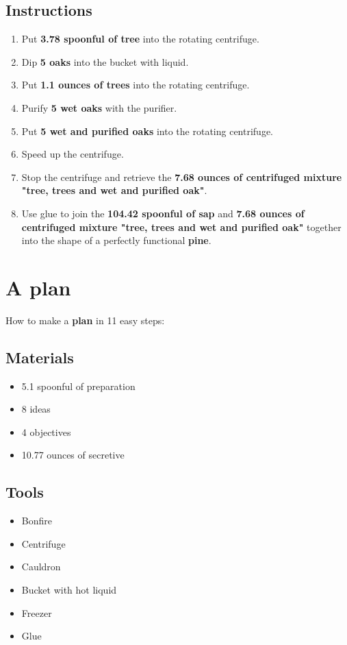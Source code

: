 \documentclass{article}
\begin{document}
\subsection{Instructions}\begin{enumerate}
\item 
Put \textbf{3.78 spoonful of tree} into the rotating centrifuge.
\item 
Dip \textbf{5 oaks} into the bucket with liquid.
\item 
Put \textbf{1.1 ounces of trees} into the rotating centrifuge.
\item 
Purify \textbf{5 wet oaks} with the purifier.
\item 
Put \textbf{5 wet and purified oaks} into the rotating centrifuge.
\item 
Speed up the centrifuge.
\item 
Stop the centrifuge and retrieve the \textbf{7.68 ounces of centrifuged mixture "tree, trees and wet and purified oak"}.
\item 
Use glue to join the \textbf{104.42 spoonful of sap} and \textbf{7.68 ounces of centrifuged mixture "tree, trees and wet and purified oak"} together into the shape of a perfectly functional \textbf{pine}.
\end{enumerate}
\newpage
\section{A plan}How to make a \textbf{plan} in 11 easy steps:

\subsection{Materials}\begin{itemize}
\item 
5.1 spoonful of preparation
\item 
8 ideas
\item 
4 objectives
\item 
10.77 ounces of secretive
\end{itemize}
\subsection{Tools}\begin{itemize}
\item 
Bonfire
\item 
Centrifuge
\item 
Cauldron
\item 
Bucket with hot liquid
\item 
Freezer
\item 
Glue
\end{itemize}
\end{document}
